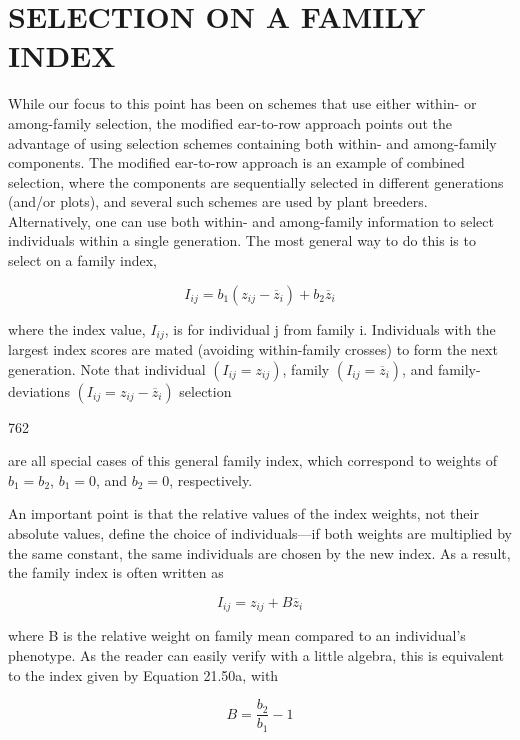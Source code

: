 \documentclass{article}
\begin{document}
\section{SELECTION ON A FAMILY INDEX}
While our focus to this point has been on schemes that use either within- or among-family selection, the modified ear-to-row approach points out the advantage of using selection schemes containing both within- and among-family components. The modified ear-to-row approach is an example of combined selection, where the components are sequentially selected in different generations (and/or plots), and several such schemes are used by plant breeders. Alternatively, one can use both within- and among-family information to select individuals within a single generation. The most general way to do this is to select on a family index,

\begin{equation}
I_{i j}=b_{1}\left(z_{i j}-\overline{z}_{i}\right)+b_{2}\overline{z}_{i}
\tag{21.50a}
\label{eq:21_50a}
\end{equation}

where the index value,  $ I_{ij} $, is for individual j from family i. Individuals with the largest index scores are mated (avoiding within-family crosses) to form the next generation. Note that individual  $ (I_{ij} = z_{ij}) $, family  $ (I_{ij} = \overline{z}_i) $, and family-deviations  $ (I_{ij} = z_{ij} - \overline{z}_i) $ selection

762

are all special cases of this general family index, which correspond to weights of  $ b_{1}=b_{2} $,  $ b_{1}=0 $, and  $ b_{2}=0 $, respectively.

An important point is that the relative values of the index weights, not their absolute values, define the choice of individuals—if both weights are multiplied by the same constant, the same individuals are chosen by the new index. As a result, the family index is often written as

\begin{equation}
I_{ij}=z_{ij}+B\overline{z}_{i}
\tag{21.50b}
\label{eq:21_50b}
\end{equation}

where B is the relative weight on family mean compared to an individual's phenotype. As the reader can easily verify with a little algebra, this is equivalent to the index given by Equation 21.50a, with

\begin{equation}
B=\frac{b_{2}}{b_{1}}-1
\tag{21.50c}
\label{eq:21_50c}
\end{equation}
\end{document}
